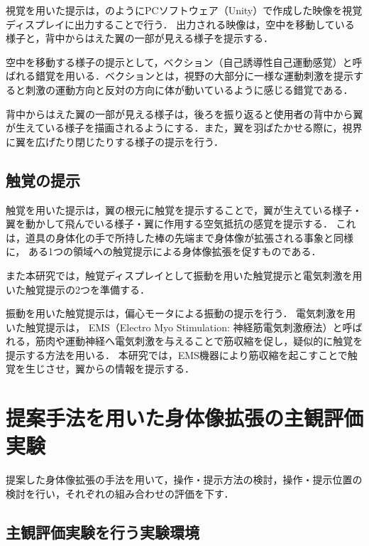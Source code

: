 \begin{small}
      視覚を用いた提示は，のようにPCソフトウェア（Unity）で作成した映像を視覚ディスプレイに出力することで行う．
      出力される映像は，空中を移動している様子と，背中からはえた翼の一部が見える様子を提示する．

      空中を移動する様子の提示として，ベクション（自己誘導性自己運動感覚）と呼ばれる錯覚を用いる．ベクションとは，視野の大部分に一様な運動刺激を提示すると刺激の運動方向と反対の方向に体が動いているように感じる錯覚である\cite{bhalla1999visual}．

      背中からはえた翼の一部が見える様子は，後ろを振り返ると使用者の背中から翼が生えている様子を描画されるようにする．また，翼を羽ばたかせる際に，視界に翼を広げたり閉じたりする様子の提示を行う．

    \subsection{触覚の提示} %
      触覚を用いた提示は，翼の根元に触覚を提示することで，翼が生えている様子・翼を動かして飛んでいる様子・翼に作用する空気抵抗の感覚を提示する．
      これは，道具の身体化の手で所持した棒の先端まで身体像が拡張される事象と同様に，
      ある1つの領域への触覚提示による身体像拡張を促すものである．
      
      また本研究では，触覚ディスプレイとして振動を用いた触覚提示と電気刺激を用いた触覚提示の2つを準備する．
      
      振動を用いた触覚提示は，偏心モータによる振動の提示を行う．
      電気刺激を用いた触覚提示は，
      EMS（Electro Myo Stimulation: 神経筋電気刺激療法）と呼ばれる，筋肉や運動神経へ電気刺激を与えることで筋収縮を促し，疑似的に触覚を提示する方法を用いる．
      本研究では，EMS機器により筋収縮を起こすことで触覚を生じさせ，翼からの情報を提示する．


\section{提案手法を用いた身体像拡張の主観評価実験}
  提案した身体像拡張の手法を用いて，操作・提示方法の検討，操作・提示位置の検討を行い，それぞれの組み合わせの評価を下す．

  \subsection{主観評価実験を行う実験環境}
    

\end{small}
